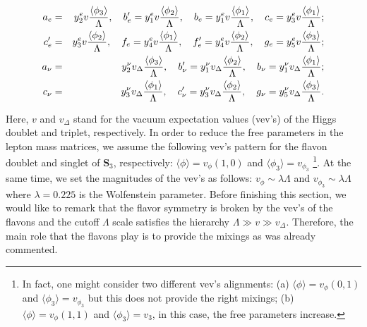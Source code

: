 \documentclass[aps,prd,groupaddress,floatfix,tighten,nofootinbib,showpacs,amsfonts,superscriptaddress]{revtex4-2}
\begin{document}
\begin{eqnarray}
a_{e} &=&y_{2}^{e}v \frac{\langle \phi_{3}\rangle}{\Lambda},\quad b_{e}^{\prime }=y_{1}^{e} v\frac{\langle \phi_{2}\rangle}{\Lambda},\quad
b_{e}=y_{1}^{e}v\frac{\langle \phi_{1}\rangle}{\Lambda},\quad c_{e}=y_{3}^{e}v\frac{\langle \phi_{1}\rangle}{\Lambda};\notag \\ c_{e}^{\prime
}&=&y_{3}^{e}v\frac{\langle \phi_{2}\rangle}{\Lambda},\quad f_{e}=y_{4}^{e}v\frac{\langle \phi_{1}\rangle}{\Lambda},\quad
f_{e}^{\prime } =y_{4}^{e} v\frac{\langle \phi_{2}\rangle}{\Lambda},\quad g_{e}=y_{5}^{e} v\frac{\langle \phi_{3}\rangle}{\Lambda};\notag \\
a_{\nu} &=&y_{2}^{\nu}v_{\Delta} \frac{\langle \phi_{3}\rangle}{\Lambda} ,\quad b_{\nu}^{\prime }=y_{1}^{\nu} v_{\Delta} \frac{\langle \phi_{2}\rangle}{\Lambda},\quad
b_{\nu}=y_{1}^{\nu}v_{\Delta} \frac{\langle \phi_{1}\rangle}{\Lambda};\notag \\ c_{\nu}&=&y_{3}^{\nu}v_{\Delta} \frac{\langle \phi_{1}\rangle}{\Lambda},\quad c_{\nu}^{\prime
}=y_{3}^{\nu}v_{\Delta} \frac{\langle \phi_{2}\rangle}{\Lambda},\quad g_{\nu}=y_{5}^{\nu}v_{\Delta} \frac{\langle \phi_{3}\rangle}{\Lambda}.
\end{eqnarray}


Here, $v$ and $v_{\Delta}$ stand for the vacuum expectation values (vev's) of the Higgs doublet and triplet, respectively. In order to reduce the free parameters in the lepton mass matrices, we assume the following vev's pattern for the flavon doublet and singlet of $\mathbf{S}_{3}$, respectively: $\langle \phi\rangle=v_{\phi}(1, 0)$ and $\langle \phi_{3}\rangle=v_{\phi_{3}}$ \footnote{In fact, one might consider two different vev's alignments: (a)  $\langle \phi\rangle=v_{\phi}(0, 1)$ and $\langle \phi_{3}\rangle=v_{\phi_{3}}$ but this does not provide the right mixings; (b) $\langle \phi\rangle=v_{\phi}(1, 1)$ and $\langle \phi_{3}\rangle=v_{3}$, in this case, the free parameters increase.}. At the same time, we set the magnitudes of the vev's as follows: $v_{\phi}\sim \lambda \Lambda$ and $v_{\phi_{3}}\sim\lambda \Lambda$ where $\lambda=0.225$ is the Wolfenstein parameter. Before finishing this section, we would like to remark that the flavor symmetry is broken by the vev's of the flavons and the cutoff $\Lambda$ scale satisfies the hierarchy $\Lambda\gg v\gg v_{\Delta}$. Therefore, the main role that the flavons play is to provide the mixings as was already commented.


\end{document}
